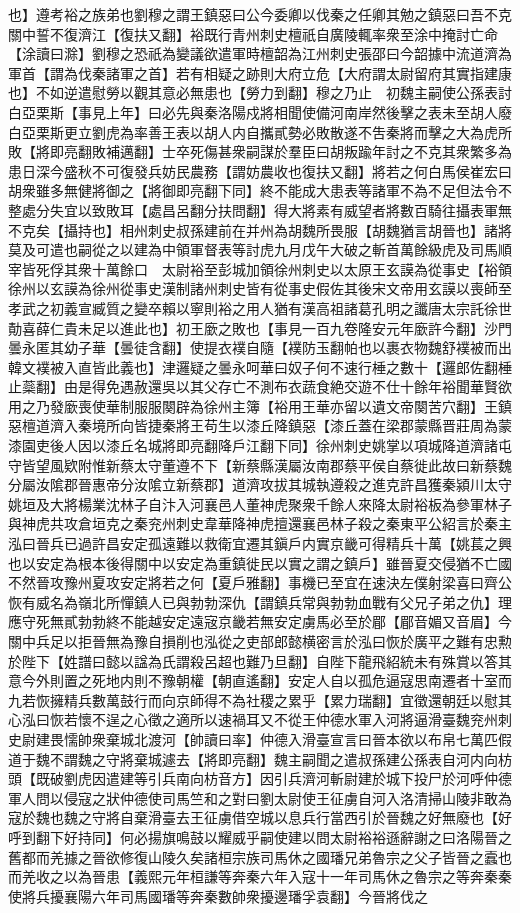 也】遵考裕之族弟也劉穆之謂王鎮惡曰公今委卿以伐秦之任卿其勉之鎮惡曰吾不克關中誓不復濟江【復扶又翻】裕既行青州刺史檀祇自廣陵輒率衆至涂中掩討亡命【涂讀曰滁】劉穆之恐祇為變議欲遣軍時檀韶為江州刺史張邵曰今韶據中流道濟為軍首【謂為伐秦諸軍之首】若有相疑之跡則大府立危【大府謂太尉留府其實指建康也】不如逆遣慰勞以觀其意必無患也【勞力到翻】穆之乃止　初魏主嗣使公孫表討白亞栗斯【事見上年】曰必先與秦洛陽戍將相聞使備河南岸然後擊之表未至胡人廢白亞栗斯更立劉虎為率善王表以胡人内自攜貳勢必敗散遂不吿秦將而擊之大為虎所敗【將即亮翻敗補邁翻】士卒死傷甚衆嗣謀於羣臣曰胡叛踰年討之不克其衆繁多為患日深今盛秋不可復發兵妨民農務【謂妨農收也復扶又翻】將若之何白馬侯崔宏曰胡衆雖多無健將御之【將御即亮翻下同】終不能成大患表等諸軍不為不足但法令不整處分失宜以致敗耳【處昌呂翻分扶問翻】得大將素有威望者將數百騎往攝表軍無不克矣【攝持也】相州刺史叔孫建前在并州為胡魏所畏服【胡魏猶言胡晉也】諸將莫及可遣也嗣從之以建為中領軍督表等討虎九月戊午大破之斬首萬餘級虎及司馬順宰皆死俘其衆十萬餘口　太尉裕至彭城加領徐州刺史以太原王玄謨為從事史【裕領徐州以玄謨為徐州從事史漢制諸州刺史皆有從事史假佐其後宋文帝用玄謨以喪師至孝武之初義宣臧質之變卒賴以寧則裕之用人猶有漢高祖諸葛孔明之讖唐太宗託徐世勣喜薛仁貴未足以進此也】初王廞之敗也【事見一百九卷隆安元年廞許今翻】沙門曇永匿其幼子華【曇徒含翻】使提衣襆自隨【襆防玉翻帕也以裹衣物魏舒襆被而出韓文襆被入直皆此義也】津邏疑之曇永呵華曰奴子何不速行棰之數十【邏郎佐翻棰止蘂翻】由是得免遇赦還吳以其父存亡不測布衣蔬食絶交遊不仕十餘年裕聞華賢欲用之乃發廞喪使華制服服闋辟為徐州主簿【裕用王華亦留以遺文帝闋苦穴翻】王鎮惡檀道濟入秦境所向皆捷秦將王苟生以漆丘降鎮惡【漆丘蓋在梁郡蒙縣晋莊周為蒙漆園吏後人因以漆丘名城將即亮翻降戶江翻下同】徐州刺史姚掌以項城降道濟諸屯守皆望風欵附惟新蔡太守董遵不下【新蔡縣漢屬汝南郡蔡平侯自蔡徙此故曰新蔡魏分屬汝隂郡晉惠帝分汝隂立新蔡郡】道濟攻拔其城執遵殺之進克許昌獲秦潁川太守姚垣及大將楊業沈林子自汴入河襄邑人董神虎聚衆千餘人來降太尉裕板為參軍林子與神虎共攻倉垣克之秦兖州刺史韋華降神虎擅還襄邑林子殺之秦東平公紹言於秦主泓曰晉兵已過許昌安定孤遠難以救衛宜遷其鎭戶内實京畿可得精兵十萬【姚萇之興也以安定為根本後得關中以安定為重鎮徙民以實之謂之鎮戶】雖晉夏交侵猶不亡國不然晉攻豫州夏攻安定將若之何【夏戶雅翻】事機已至宜在速決左僕射梁喜曰齊公恢有威名為嶺北所憚鎮人已與勃勃深仇【謂鎮兵常與勃勃血戰有父兄子弟之仇】理應守死無貳勃勃終不能越安定遠宼京畿若無安定虜馬必至於郿【郿音媚又音眉】今關中兵足以拒晉無為豫自損削也泓從之吏部郎懿横密言於泓曰恢於廣平之難有忠勲於陛下【姓譜曰懿以諡為氏謂殺呂超也難乃旦翻】自陛下龍飛紹統未有殊賞以答其意今外則置之死地内則不豫朝權【朝直遙翻】安定人自以孤危逼寇思南遷者十室而九若恢擁精兵數萬鼓行而向京師得不為社稷之累乎【累力瑞翻】宜徵還朝廷以慰其心泓曰恢若懷不逞之心徵之適所以速禍耳又不從王仲德水軍入河將逼滑臺魏兖州刺史尉建畏懦帥衆棄城北渡河【帥讀曰率】仲德入滑臺宣言曰晉本欲以布帛七萬匹假道于魏不謂魏之守將棄城遽去【將即亮翻】魏主嗣聞之遣叔孫建公孫表自河内向枋頭【既破劉虎因遣建等引兵南向枋音方】因引兵濟河斬尉建於城下投尸於河呼仲德軍人問以侵寇之狀仲德使司馬竺和之對曰劉太尉使王征虜自河入洛清掃山陵非敢為寇於魏也魏之守將自棄滑臺去王征虜借空城以息兵行當西引於晉魏之好無廢也【好呼到翻下好持同】何必揚旗鳴鼓以耀威乎嗣使建以問太尉裕裕遜辭謝之曰洛陽晉之舊都而羌據之晉欲修復山陵久矣諸桓宗族司馬休之國璠兄弟魯宗之父子皆晉之蠧也而羌收之以為晉患【義熙元年桓謙等奔秦六年入寇十一年司馬休之魯宗之等奔秦秦使將兵擾襄陽六年司馬國璠等奔秦數帥衆擾邊璠孚袁翻】今晉將伐之